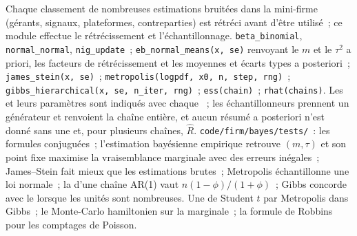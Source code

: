 \begin{build}
 Chaque classement de nombreuses estimations bruitées dans la mini-firme (gérants, signaux, plateformes, contreparties) est rétréci avant
d'être utilisé~; ce module effectue le rétrécissement et l'échantillonnage.
 \texttt{beta\_binomial}, \texttt{normal\_normal}, \texttt{nig\_update}~; \texttt{eb\_normal\_means(x, se)} renvoyant le
$m$ et le $\tau^2$ a priori, les facteurs de rétrécissement et les moyennes et écarts types a posteriori~; \texttt{james\_stein(x, se)}~;
\texttt{metropolis(logpdf, x0, n, step, rng)}~; \texttt{gibbs\_hierarchical(x, se, n\_iter, rng)}~; \texttt{ess(chain)}~;
\texttt{rhat(chains)}.
 Les  et leurs paramètres sont indiqués avec chaque ~; les échantillonneurs prennent un générateur et renvoient la chaîne entière, et aucun
résumé a posteriori n'est donné sans une  et, pour plusieurs chaînes, $\hat R$.
 \texttt{code/firm/bayes/tests/}~: les formules conjuguées~; l'estimation bayésienne empirique retrouve $(m, \tau)$ et son point fixe
maximise la vraisemblance marginale avec des erreurs inégales~; James--Stein fait mieux que les estimations brutes~; Metropolis échantillonne une loi normale~; la  d'une chaîne AR(1) vaut $n(1 - \phi)/(1 + \phi)$~; Gibbs concorde avec le  lorsque les unités sont nombreuses.
 Une  de Student $t$ par Metropolis dans Gibbs~; le Monte-Carlo hamiltonien sur la  marginale~; la formule de Robbins pour
les comptages de Poisson.
\end{build}

